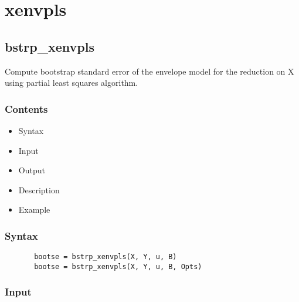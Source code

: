 \documentclass[a4paper,11pt,openany]{memoir}
\begin{document}
\newpage

\chapter{xenvpls}
\rmfamily
\color{black}\section{bstrp\_xenvpls}

\begin{par}
Compute bootstrap standard error of the envelope model for the reduction on X using partial least squares algorithm.
\end{par} \vspace{1em}

\subsection*{Contents}

\begin{itemize}
\setlength{\itemsep}{-1ex}
   \item Syntax
   \item Input
   \item Output
   \item Description
   \item Example
\end{itemize}


\subsection*{Syntax}


\begin{verbatim}       bootse = bstrp_xenvpls(X, Y, u, B)
       bootse = bstrp_xenvpls(X, Y, u, B, Opts)\end{verbatim}
    

\subsection*{Input}
\end{document}
